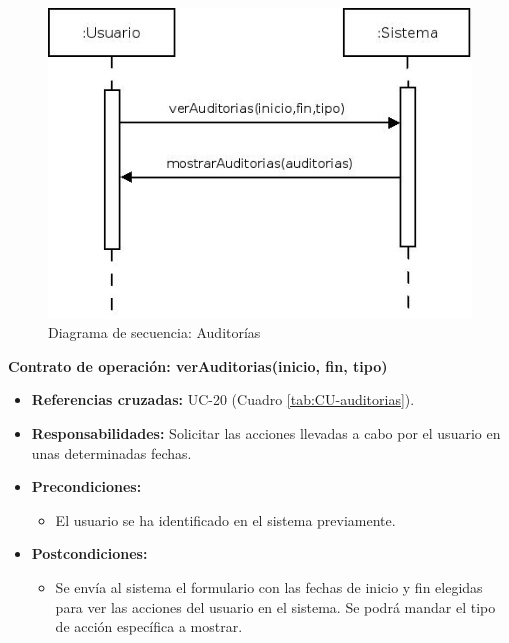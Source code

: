\begin{figure}[H]
\centering
  \includegraphics[scale=.55]{img/secuencias/auditorias.jpeg}
  \caption{Diagrama de secuencia: Auditorías}
  \label{fig:secuencia-auditorias}
\end{figure}

\textbf{Contrato de operación: verAuditorias(inicio, fin, tipo)}
\begin{itemize}
\item \textbf{Referencias cruzadas:} UC-20 (Cuadro \ref{tab:CU-auditorias}).
\item \textbf{Responsabilidades:} Solicitar las acciones llevadas a cabo por el usuario en unas determinadas fechas.
\item \textbf{Precondiciones:} 
 \begin{itemize}
\item El usuario se ha identificado en el sistema previamente.
\end {itemize}
\item \textbf{Postcondiciones:} 
 \begin{itemize}
\item Se envía al sistema el formulario con las fechas de inicio y fin elegidas para ver las acciones del usuario en el sistema. Se podrá mandar el tipo de acción específica a mostrar.
\end {itemize}
\end {itemize}

